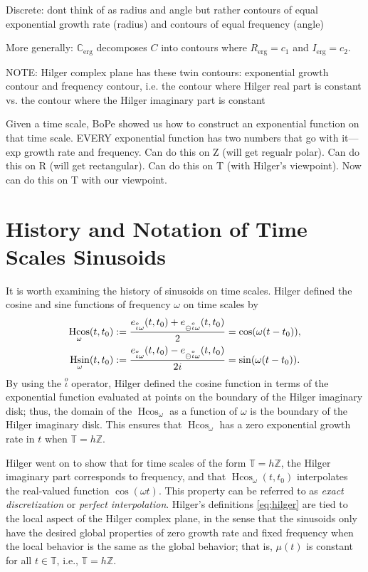 \documentclass[reqno]{amsart}
\theoremstyle{plain}
\theoremstyle{definition}
\numberwithin{theorem}{section}
\numberwithin{definition}{section}
\numberwithin{prop}{section}
\numberwithin{example}{section}
\newcommand{\Cerg}{\ensuremath{\mathbb{C}_{\text{erg}}}}
\newcommand{\Rerg}{\ensuremath{R_{\text{erg}}}}
\newcommand{\Ierg}{\ensuremath{I_{\text{erg}}}}
\DeclareMathOperator{\Hcos}{Hcos} %
\DeclareMathOperator{\Hsin}{Hsin}
\begin{document}
Discrete: dont think of as radius and angle but rather contours of equal exponential growth rate (radius) and contours of equal frequency (angle)


More generally: $\Cerg$ decomposes $C$ into contours where $\Rerg=c_1$ and $\Ierg=c_2$.

NOTE: Hilger complex plane has these twin contours: exponential growth contour and frequency contour, i.e. the contour where Hilger real part is constant vs. the contour where the Hilger imaginary part is constant

Given a time scale, BoPe showed us how to construct an exponential function on that time scale. EVERY exponential function has two numbers that go with it---exp growth rate and frequency. Can do this on Z (will get regualr polar). Can do this on R (will get rectangular). Can do this on T (with Hilger's viewpoint). Now can do this on T with our viewpoint.

\section{History and Notation of Time Scales Sinusoids}
It is worth examining the history of sinusoids on time scales. Hilger \cite{Hilger1999} defined the cosine and sine functions of frequency $\omega$ on time scales by 
\begin{subequations}
\begin{align}
\Hcos_{\omega}(t,t_0) &:= {e_{\stackrel{o}{\iota} \omega}(t,t_0)+ e_{\ominus \stackrel{o}{\iota} \omega}(t,t_0)\over 2}=\cos(\omega (t-t_0)),\label{eq:hilger_cos}\\
\Hsin_{\omega}(t,t_0) &:= {e_{\stackrel{o}{\iota} \omega}(t,t_0)- e_{\ominus \stackrel{o}{\iota} \omega}(t,t_0)\over 2i}=\sin(\omega (t-t_0)).\label{eq:hilger_sin}
\end{align}\label{eq:hilger}
\end{subequations}
By using the $\stackrel{o}{\iota}$ operator, Hilger defined the cosine function in terms of the exponential function evaluated at points on the boundary of the Hilger imaginary disk; thus, the domain of the $\Hcos_{\omega}$ as a function of $\omega$ is the boundary of the Hilger imaginary disk. This ensures that $\Hcos_{\omega}$ has a zero exponential growth rate in $t$ when $\mathbb{T} = h \mathbb{Z}$.

Hilger went on to show that for time scales of the form $\mathbb{T}=h \mathbb{Z}$, the Hilger imaginary part corresponds to frequency, and that $\Hcos_{\omega}(t,t_0)$ interpolates the real-valued function $\cos(\omega t).$ This property can be referred to as {\it exact discretization} \cite{Cielinski} or {\it perfect interpolation}. Hilger's definitions \eqref{eq:hilger} are tied to the local aspect of the Hilger complex plane, in the sense that the sinusoids only have the desired global properties of zero growth rate and fixed frequency when the local behavior is the same as the global behavior; that is, $\mu(t)$ is constant for all $t \in \mathbb{T}$, i.e., $\mathbb{T}=h\mathbb{Z}$. 
\end{document}
